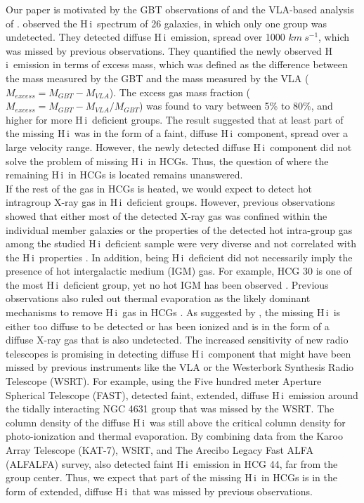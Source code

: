 \documentclass{aa}
\newcommand{\HI}{H\,{\sc i}}
\begin{document}
Our paper is motivated by the GBT observations of 
\citet{2010ApJ...710..385B} and the VLA-based analysis of \citet{2023A&A...670A..21J}. \citet{2010ApJ...710..385B} observed the \HI\ spectrum of 26 galaxies, in which only one group was undetected. They detected diffuse \HI\ emission, spread 
over 1000 $km~s^{-1}$, which was missed by previous observations. They quantified the newly observed \HI\ emission in terms of excess mass, 
which was defined as the difference between the mass measured by the GBT and the mass measured by the VLA ($M_{excess}=M_{GBT}-M_{VLA}$). The excess gas mass 
fraction ($M_{excess}=M_{GBT}-M_{VLA}/M_{GBT}$) was found to vary between 5\% to 80\%, and higher for more \HI\ deficient groups. 
The result suggested that at least part of the missing \HI\ was in the form of a faint, diffuse \HI\ component, spread over a large velocity range. 
However, the newly detected diffuse \HI\ component did not solve the problem of missing \HI\ in HCGs. Thus, the question of where the remaining \HI\ in HCGs is located 
remains unanswered. \\
   
If the rest of the gas in HCGs is heated, we would expect to detect hot intragroup X-ray gas in \HI\ deficient groups. However, previous observations showed 
that either most of the detected X-ray gas was confined within the individual member galaxies \citep{2017MNRAS.464..957H} or the properties of the detected
hot intra-group gas among the studied \HI\ deficient sample were very diverse and not correlated with the \HI\ properties \citep{2008MNRAS.388.1245R}. 
In addition, being \HI\ deficient did not necessarily imply the presence of hot intergalactic medium (IGM) gas. For example, HCG 30 is one of the most \HI\ 
deficient group, yet no hot IGM has been observed \citep{2008MNRAS.388.1245R}. Previous observations also ruled out thermal evaporation as the likely dominant 
mechanisms to remove \HI\ gas in HCGs \citep{2008MNRAS.388.1245R}. As suggested by \citet{2017MNRAS.464..957H}, the missing \HI\ is either too diffuse to be detected 
or has been ionized and is in the form of a diffuse X-ray gas that is also undetected. The increased sensitivity of new radio telescopes is promising in detecting diffuse
\HI\ component that might have been missed by previous instruments like the VLA or the Westerbork Synthesis Radio Telescope (WSRT). For example, using the 
Five hundred meter Aperture Spherical Telescope (FAST), \citet{2023ApJ...944..102W} detected faint, extended, diffuse \HI\ emission around the tidally interacting 
NGC 4631 group that was missed by the WSRT. The column density of the diffuse \HI\ was still above the critical column density for photo-ionization and thermal evaporation.
By combining data from the Karoo Array Telescope (KAT-7), WSRT, and The Arecibo Legacy Fast ALFA (ALFALFA) survey, \citet{2017MNRAS.464..957H} also detected 
faint \HI\ emission in HCG 44, far from the group center. Thus, we expect that part of the missing \HI\ in HCGs is in the form of extended, diffuse \HI\ that 
was missed by previous observations. \\
   
\end{document}
